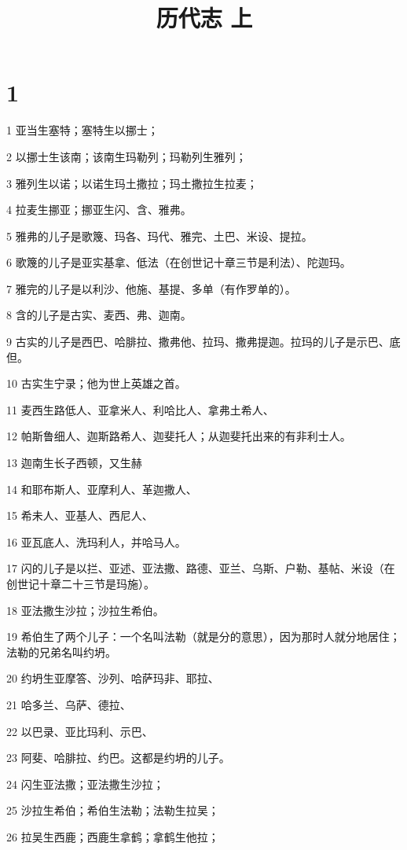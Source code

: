 

\title{历代志 上}


\chapter{1}

\par 1 亚当生塞特；塞特生以挪士；
\par 2 以挪士生该南；该南生玛勒列；玛勒列生雅列；
\par 3 雅列生以诺；以诺生玛土撒拉；玛土撒拉生拉麦；
\par 4 拉麦生挪亚；挪亚生闪、含、雅弗。
\par 5 雅弗的儿子是歌篾、玛各、玛代、雅完、土巴、米设、提拉。
\par 6 歌篾的儿子是亚实基拿、低法（在创世记十章三节是利法）、陀迦玛。
\par 7 雅完的儿子是以利沙、他施、基提、多单（有作罗单的）。
\par 8 含的儿子是古实、麦西、弗、迦南。
\par 9 古实的儿子是西巴、哈腓拉、撒弗他、拉玛、撒弗提迦。拉玛的儿子是示巴、底但。
\par 10 古实生宁录；他为世上英雄之首。
\par 11 麦西生路低人、亚拿米人、利哈比人、拿弗土希人、
\par 12 帕斯鲁细人、迦斯路希人、迦斐托人；从迦斐托出来的有非利士人。
\par 13 迦南生长子西顿，又生赫
\par 14 和耶布斯人、亚摩利人、革迦撒人、
\par 15 希未人、亚基人、西尼人、
\par 16 亚瓦底人、洗玛利人，并哈马人。
\par 17 闪的儿子是以拦、亚述、亚法撒、路德、亚兰、乌斯、户勒、基帖、米设（在创世记十章二十三节是玛施）。
\par 18 亚法撒生沙拉；沙拉生希伯。
\par 19 希伯生了两个儿子：一个名叫法勒（就是分的意思），因为那时人就分地居住；法勒的兄弟名叫约坍。
\par 20 约坍生亚摩答、沙列、哈萨玛非、耶拉、
\par 21 哈多兰、乌萨、德拉、
\par 22 以巴录、亚比玛利、示巴、
\par 23 阿斐、哈腓拉、约巴。这都是约坍的儿子。
\par 24 闪生亚法撒；亚法撒生沙拉；
\par 25 沙拉生希伯；希伯生法勒；法勒生拉吴；
\par 26 拉吴生西鹿；西鹿生拿鹤；拿鹤生他拉；
